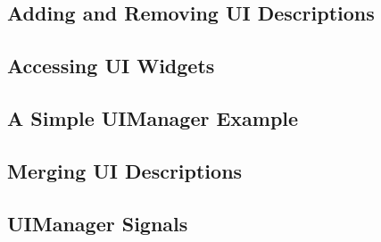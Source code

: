 	\subsection{Adding and Removing UI Descriptions}
	\subsection{Accessing UI Widgets}
	\subsection{A Simple UIManager Example}
	\subsection{Merging UI Descriptions}
	\subsection{UIManager Signals}
